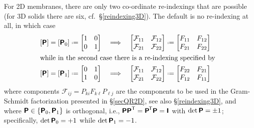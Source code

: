 For 2D membranes, there are only two co-ordinate re-indexings that are possible (for 3D solids there are six, cf.\ \S\ref{reindexing3D}).  The default is no re-indexing at all, in which case 
\begin{subequations}
	\label{membraneRelabling}
	\begin{align}
	[ \mathbfsf{P} ] = [ \mathbfsf{P}_0 ] & \defeq 
	\begin{bmatrix} 1 & 0 \\ 0 & 1 \end{bmatrix} & 
	\implies & & \begin{bmatrix}
	\mathcal{F}_{11} & \mathcal{F}_{12} \\
	\mathcal{F}_{21} & \mathcal{F}_{22}
	\end{bmatrix} & \defeq \begin{bmatrix}
	F_{11} & F_{12} \\
	F_{21} & F_{22}
	\end{bmatrix} \label{Q0} \\
	\intertext{while in the second case there is a re-indexing specified by}
	[ \mathbfsf{P} ] = [ \mathbfsf{P}_1 ] & \defeq 
	\begin{bmatrix} 0 & 1 \\ 1 & 0 \end{bmatrix} & 
	\implies & & \begin{bmatrix}
	\mathcal{F}_{11} & \mathcal{F}_{12} \\
	\mathcal{F}_{21} & \mathcal{F}_{22}
	\end{bmatrix} & \defeq \begin{bmatrix}
	F_{22} & F_{21} \\
	F_{12} & F_{11}
	\end{bmatrix}
	\label{Q1}
	\end{align}
\end{subequations}
where components $\mathcal{F}_{ij} = P_{ki} F_{k\ell} P_{\ell j}$ are the components to be used in the Gram-Schmidt factorization presented in \S\ref{secQR2D}, see also \S\ref{reindexing3D}, and where $\boldsymbol{\mathsf{P}} \in \{ \boldsymbol{\mathsf{P}}_0 , \boldsymbol{\mathsf{P}}_1 \}$ is orthogonal, i.e., $\boldsymbol{\mathsf{P}} \boldsymbol{\mathsf{P}}^{\mathsf{T}} = \boldsymbol{\mathsf{P}}^{\hspace{-1pt}\mathsf{T}} \boldsymbol{\mathsf{P}} = \boldsymbol{\mathsf{I}}$ with $\det \boldsymbol{\mathsf{P}} = \pm 1$; specifically, $\det \boldsymbol{\mathsf{P}}_0 = +1$ while $\det \boldsymbol{\mathsf{P}}_1 = -1$.

